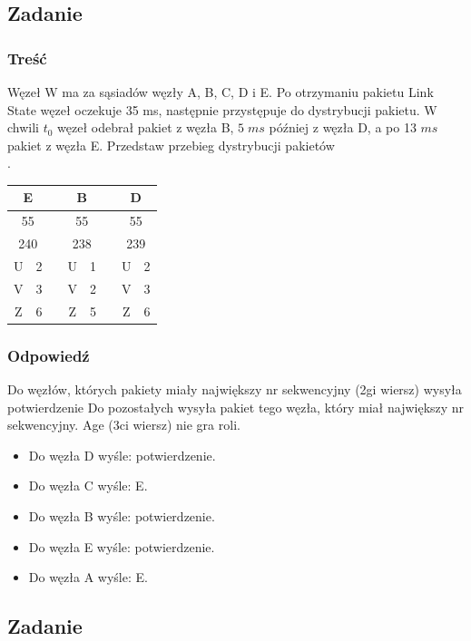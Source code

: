 \documentclass[a4paper,twoside]{article}
\begin{document}
\subsection{Zadanie}
\subsubsection{Treść}
Węzeł W ma za sąsiadów węzły A, B, C, D i E. Po otrzymaniu pakietu Link State węzeł oczekuje 35 ms, następnie przystępuje do dystrybucji pakietu. W chwili $ t_0 $ węzeł odebrał pakiet z węzła B, $ 5\;ms $ później z węzła D, a po 13 $ ms $ pakiet z węzła E. Przedstaw przebieg dystrybucji pakietów\\.
\begin{tabular}{|c|c|c|c|c|c|c|c|}
	\hline \multicolumn{2}{|c|}{\textbf{E}}  & & \multicolumn{2}{|c|}{\textbf{B}} & & \multicolumn{2}{|c|}{\textbf{D}}\\ 
	\hline \multicolumn{2}{|c|}{55} & &\multicolumn{2}{|c|}{55} & &\multicolumn{2}{|c|}{55} \\ 
	\hline \multicolumn{2}{|c|}{240} & &\multicolumn{2}{|c|}{238} & &\multicolumn{2}{|c|}{239}   \\ 
	\hline U & 2 & & U & 1 & & U & 2\\ 
	\hline V & 3 & & V & 2 & & V & 3\\
	\hline Z & 6 & & Z & 5 & & Z & 6\\
	\hline 
\end{tabular}
\subsubsection{Odpowiedź}
Do węzłów, których pakiety miały największy nr sekwencyjny (2gi wiersz) wysyła potwierdzenie
Do pozostałych wysyła pakiet tego węzła, który miał największy nr sekwencyjny. Age (3ci wiersz) nie gra roli.
\begin{itemize}
	\item Do węzła D wyśle: potwierdzenie.
	\item Do węzła C wyśle: E.
	\item Do węzła B wyśle: potwierdzenie.
	\item Do węzła E wyśle: potwierdzenie.
	\item Do węzła A wyśle: E.
\end{itemize}
\subsection{Zadanie}
\end{document}
